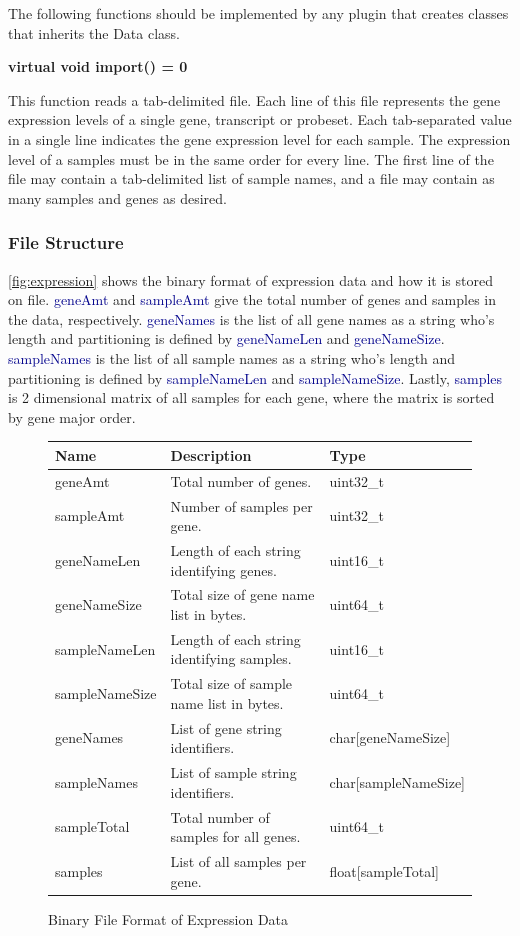 \documentclass[10pt]{article}
\providecommand{\h}[1]{\textcolor{darkblue}{#1}}
\begin{document}
\begin{appendices}
The following functions should be implemented by any plugin that creates
classes that inherits the Data class.

{\bfseries virtual void import() = 0}

This function reads a tab-delimited file.  Each line of this file
represents the gene expression levels of a single gene, transcript or probeset.
Each tab-separated value in a single line indicates the gene expression level 
for each sample. The expression level of a samples must be in the same 
order for every line.  The first line of the file may contain a tab-delimited
list of sample names, and a file may contain as many samples and genes as
desired.

\subsubsection{File Structure}

\autoref{fig:expression} shows the binary format of expression data and how it 
is stored on file. \h{geneAmt} and \h{sampleAmt} give the total number of genes 
and samples in the data, respectively. \h{geneNames} is the list of all gene 
names as a string who's length and partitioning is defined by \h{geneNameLen} 
and \h{geneNameSize}. \h{sampleNames} is the list of all sample names as a 
string who's length and partitioning is defined by \h{sampleNameLen} and 
\h{sampleNameSize}. Lastly, \h{samples} is 2 dimensional matrix of all samples 
for each gene, where the matrix is sorted by gene major order.

\begin{figure}[H]
\begin{mdframed}[style=btable]
\begin{tabularx}{\textwidth}{|l|X|l|}
\hline
\textbf{Name} & \textbf{Description} & \textbf{Type} \\
\hline
geneAmt & Total number of genes. & uint32\_t \\
\hline
sampleAmt & Number of samples per gene. & uint32\_t \\
\hline
geneNameLen & Length of each string identifying genes. & uint16\_t \\
\hline
geneNameSize & Total size of gene name list in bytes. & uint64\_t \\
\hline
sampleNameLen & Length of each string identifying samples. & uint16\_t \\
\hline
sampleNameSize & Total size of sample name list in bytes. & uint64\_t \\
\hline
geneNames & List of gene string identifiers. & char[geneNameSize] \\
\hline
sampleNames & List of sample string identifiers. & char[sampleNameSize] \\
\hline
sampleTotal & Total number of samples for all genes. & uint64\_t \\
\hline
samples & List of all samples per gene. & float[sampleTotal] \\
\hline
\end{tabularx}
\end{mdframed}
\caption{Binary File Format of Expression Data}
\label{fig:expression}
\end{figure}


\end{appendices}
\end{document}
